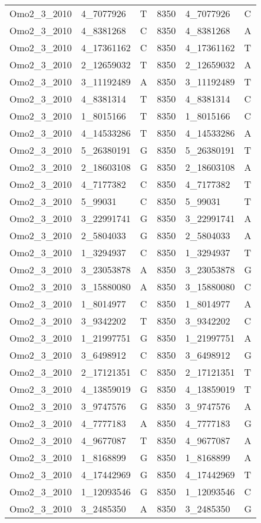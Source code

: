 \begin{center}
\begin{longtable}{|l|l|l|l|l|l|}
Omo2\_3\_2010&4\_7077926&T&8350&4\_7077926&C\\
Omo2\_3\_2010&4\_8381268&C&8350&4\_8381268&A\\
Omo2\_3\_2010&4\_17361162&C&8350&4\_17361162&T\\
Omo2\_3\_2010&2\_12659032&T&8350&2\_12659032&A\\
Omo2\_3\_2010&3\_11192489&A&8350&3\_11192489&T\\
Omo2\_3\_2010&4\_8381314&T&8350&4\_8381314&C\\
Omo2\_3\_2010&1\_8015166&T&8350&1\_8015166&C\\
Omo2\_3\_2010&4\_14533286&T&8350&4\_14533286&A\\
Omo2\_3\_2010&5\_26380191&G&8350&5\_26380191&T\\
Omo2\_3\_2010&2\_18603108&G&8350&2\_18603108&A\\
Omo2\_3\_2010&4\_7177382&C&8350&4\_7177382&T\\
Omo2\_3\_2010&5\_99031&C&8350&5\_99031&T\\
Omo2\_3\_2010&3\_22991741&G&8350&3\_22991741&A\\
Omo2\_3\_2010&2\_5804033&G&8350&2\_5804033&A\\
Omo2\_3\_2010&1\_3294937&C&8350&1\_3294937&T\\
Omo2\_3\_2010&3\_23053878&A&8350&3\_23053878&G\\
Omo2\_3\_2010&3\_15880080&A&8350&3\_15880080&C\\
Omo2\_3\_2010&1\_8014977&C&8350&1\_8014977&A\\
Omo2\_3\_2010&3\_9342202&T&8350&3\_9342202&C\\
Omo2\_3\_2010&1\_21997751&G&8350&1\_21997751&A\\
Omo2\_3\_2010&3\_6498912&C&8350&3\_6498912&G\\
Omo2\_3\_2010&2\_17121351&C&8350&2\_17121351&T\\
Omo2\_3\_2010&4\_13859019&G&8350&4\_13859019&T\\
Omo2\_3\_2010&3\_9747576&G&8350&3\_9747576&A\\
Omo2\_3\_2010&4\_7777183&A&8350&4\_7777183&G\\
Omo2\_3\_2010&4\_9677087&T&8350&4\_9677087&A\\
Omo2\_3\_2010&1\_8168899&G&8350&1\_8168899&A\\
Omo2\_3\_2010&4\_17442969&G&8350&4\_17442969&T\\
Omo2\_3\_2010&1\_12093546&G&8350&1\_12093546&C\\
Omo2\_3\_2010&3\_2485350&A&8350&3\_2485350&G\\

\end{longtable}
\end{center}
